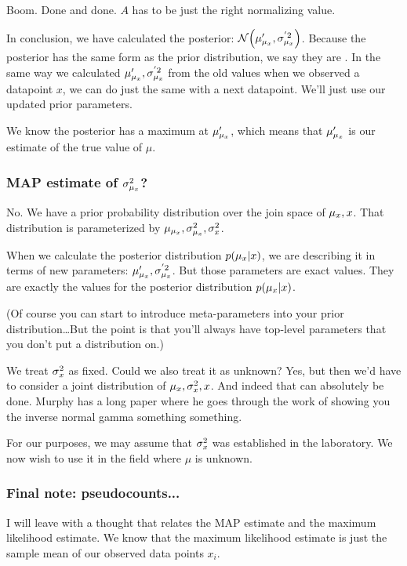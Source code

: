 Boom. Done and done. $A$ has to be just the right normalizing value.

In conclusion, we have calculated the posterior:
$\mathcal{N}\mathopen{}\left( {\mu'_{\mu_x}, \sigma^{'2}_{\mu_x}} \right)\mathclose{}$. Because the posterior has the same form as
the prior distribution, we say they are . In the same
way we calculated $\mu'_{\mu_x}, \sigma^{'2}_{\mu_x}$ from the old values when we
observed a datapoint $x$, we can do just the same with a next datapoint.
We'll just use our updated prior parameters.

We know the posterior has a maximum at $\mu'_{\mu_x}$, which means that
$\mu'_{\mu_x}$ is our  estimate of the true
value of $\mu$.

\subsubsection{MAP estimate of $\sigma^2_{\mu_x}$?}

No. We have a prior probability distribution over the join space of
$\mu_x, x$. That distribution is parameterized by $\mu_{\mu_x}, \sigma^2_{\mu_x},
\sigma^2_x$.

When we calculate the posterior distribution $p\mathopen{}\left( {\mu_x | x} \right)\mathclose{}$, we are
describing it in terms of new parameters: $\mu'_{\mu_x}, \sigma^{'2}_{\mu_x}$. But those
parameters are exact values. They are exactly the values for the
posterior distribution $p\mathopen{}\left( {\mu_x | x} \right)\mathclose{}$.

(Of course you can start to introduce meta-parameters into your prior
distribution\ldots But the point is that you'll always have top-level
parameters that you don't put a distribution on.)

We treat $\sigma^2_x$ as fixed. Could we also treat it as unknown? Yes, but
then we'd have to consider a joint distribution of $\mu_x, \sigma^2_x, x$. And
indeed that can absolutely be done. Murphy has a long paper where he
goes through the work of showing you the inverse normal gamma something
something.

For our purposes, we may assume that $\sigma^2_x$ was established in the
laboratory. We now wish to use it in the field where $\mu$ is unknown.

\subsubsection{Final note: pseudocounts...}

I will leave with a thought that relates the MAP estimate and the
maximum likelihood estimate. We know that the maximum likelihood
estimate is just the sample mean of our observed data points $x_i$.

